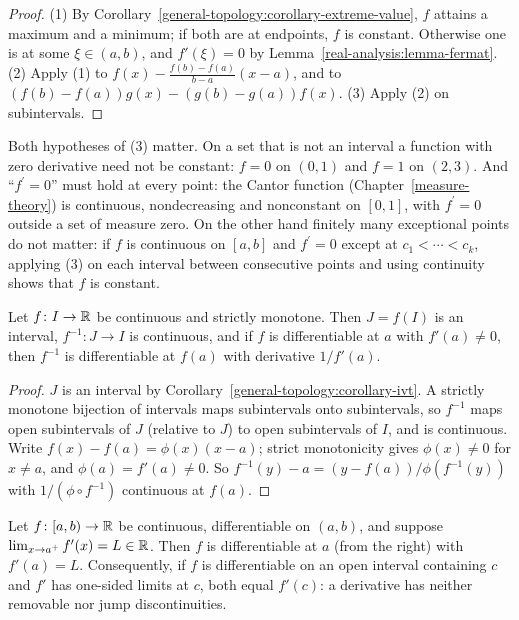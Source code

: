 \begin{proof}
(1) By Corollary~\ref{general-topology:corollary-extreme-value}, $f$ attains a maximum and a minimum; if both are at endpoints, $f$ is constant. Otherwise one is at some
$\xi \in (a, b)$, and $f'(\xi) = 0$ by Lemma~\ref{real-analysis:lemma-fermat}. (2) Apply (1) to $f(x) - \frac{f(b) - f(a)}{b - a}(x - a)$, and to
$(f(b) - f(a))g(x) - (g(b) - g(a))f(x)$. (3) Apply (2) on subintervals.
\end{proof}

\begin{remark}\label{real-analysis:remark-derivative-zero}
Both hypotheses of (3) matter. On a set that is not an interval a function with zero derivative need not be constant: $f = 0$ on $(0, 1)$ and $f = 1$ on $(2, 3)$. And ``$f^{\prime} = 0$'' must hold at
every point: the Cantor function (Chapter~\ref{measure-theory}) is continuous, nondecreasing and nonconstant on $[0, 1]$, with $f^{\prime} = 0$ outside a set of measure zero. On the other hand finitely
many exceptional points do not matter: if $f$ is continuous on $[a, b]$ and $f^{\prime} = 0$ except at $c_1 < \cdots < c_k$, applying (3) on each interval between consecutive points and using continuity
shows that $f$ is constant.
\end{remark}

\begin{proposition}\label{real-analysis:proposition-inverse-one}
Let $f \colon I \to \mathbb{R}$ be continuous and strictly monotone. Then $J = f(I)$ is an interval, $f^{-1} \colon J \to I$ is continuous, and if $f$ is differentiable at $a$ with
$f'(a) \neq 0$, then $f^{-1}$ is differentiable at $f(a)$ with derivative $1/f'(a)$.
\end{proposition}

\begin{proof}
$J$ is an interval by Corollary~\ref{general-topology:corollary-ivt}. A strictly monotone bijection of intervals maps subintervals onto subintervals, so $f^{-1}$ maps open subintervals of $J$
(relative to $J$) to open subintervals of $I$, and is continuous. Write $f(x) - f(a) = \phi(x)(x - a)$; strict monotonicity gives $\phi(x) \neq 0$ for $x \neq a$, and $\phi(a) = f'(a) \neq 0$. So
$f^{-1}(y) - a = (y - f(a))/\phi(f^{-1}(y))$ with $1/(\phi \circ f^{-1})$ continuous at $f(a)$.
\end{proof}

\begin{proposition}\label{real-analysis:proposition-derivative-limit}
Let $f \colon [a, b) \to \mathbb{R}$ be continuous, differentiable on $(a, b)$, and suppose $\lim_{x \to a^+}f'(x) = L \in \mathbb{R}$. Then $f$ is differentiable at $a$ (from the right) with $f'(a) = L$. Consequently, if $f$ is
differentiable on an open interval containing $c$ and $f'$ has one-sided limits at $c$, both equal $f'(c)$: a derivative has neither removable nor jump discontinuities.
\end{proposition}


